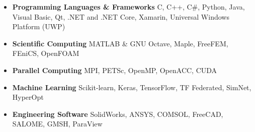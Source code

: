 \documentclass{cv}
\begin{document}
\begin{itemize}[itemsep=-0.2ex]

\item
\textbf{Programming Languages \& Frameworks}  C, C++, C\#, Python, Java, Visual Basic, Qt, .NET and .NET Core, Xamarin, Universal Windows Platform (UWP)
\item
\textbf{Scientific Computing}  MATLAB \& GNU Octave, Maple, FreeFEM, FEniCS, OpenFOAM
\item 
\textbf{Parallel Computing} MPI, PETSc, OpenMP, OpenACC, CUDA
\item
\textbf{Machine Learning} Scikit-learn, Keras, TensorFlow, TF Federated, SimNet, HyperOpt
\item
\textbf{Engineering Software} SolidWorks, ANSYS, COMSOL, FreeCAD, SALOME, GMSH, ParaView

\end{itemize}
\end{document}
